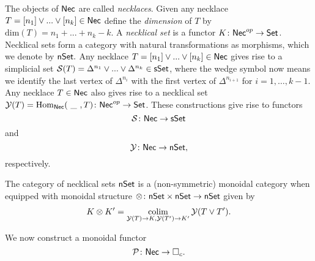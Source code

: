The objects of $\mathsf{Nec}$ are called \textit{necklaces}. Given any necklace $T=[n_1] \vee ... \vee[n_k] \in \mathsf{Nec}$ define the \textit{dimension} of $T$ by $\text{dim}(T)=n_1+ ...+n_k-k$. A \textit{necklical set} is a functor $K \colon \mathsf{Nec}^{op} \to \mathsf{Set}$. Necklical sets form a category with natural transformations as morphisms, which we denote by $\mathsf{nSet}.$ Any necklace $T=[n_1] \vee ... \vee[n_k] \in \mathsf{Nec}$ gives rise to a simplicial set $\mathcal{S}(T)= \Delta^{n_1} \vee... \vee \Delta^{n_k} \in \mathsf{sSet}$, where the wedge symbol now means we identify the last vertex of $\Delta^{n_i}$ with the first vertex of $\Delta^{n_{i+1}}$ for $i=1,\dots,k-1$. Any necklace $T \in \mathsf{Nec}$ also gives rise to a necklical set $\mathcal{Y}(T)=\mathrm{Hom}_{\mathsf{Nec}}(\text{ \_ }, T) \colon \mathsf{Nec}^{op} \to \mathsf{Set}$. These constructions give rise to functors 
$$\mathcal{S} \colon \mathsf{Nec} \to \mathsf{sSet}$$
and
$$\mathcal{Y} \colon \mathsf{Nec} \to \mathsf{nSet},$$ respectively. 

The category of necklical sets $\mathsf{nSet}$ is a (non-symmetric) monoidal category when equipped with monoidal structure $\otimes\colon \mathsf{nSet} \times \mathsf{nSet} \to \mathsf{nSet}$ given by $$K \otimes K' = \operatorname*{colim}_{\mathcal{Y}(T) \to K, \mathcal{Y}(T')\to K'} \mathcal{Y}(T \vee T').$$

We now construct a monoidal functor
$$\mathcal{P} \colon \mathsf{Nec} \to \square_c.$$

